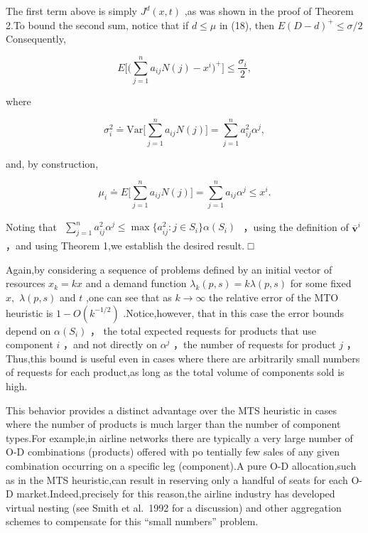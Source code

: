 The first term above is simply \(J ^ { d } ( x , t )\) ,as was shown in
the proof of Theorem 2.To bound the second sum, notice that if
\(d \leqslant \mu\) in (18), then
\(E ( D - d ) ^ { + } \leqslant \sigma / 2\) Consequently,

\[
E \Bigg [ \Bigg ( \sum _ { j = 1 } ^ { n } a _ { i j } N ( j ) - x ^ { i } \Bigg ) ^ { + } \Bigg ] \leqslant \frac { \sigma _ { i } } { 2 } ,
\]

where

\[
\sigma _ { i } ^ { 2 } \doteq \mathrm { V a r } \biggl [ \sum _ { j = 1 } ^ { n } a _ { i j } N ( j ) \biggr ] = \sum _ { j = 1 } ^ { n } a _ { i j } ^ { 2 } \alpha ^ { j } ,
\]

and, by construction,

\[
\mu _ { i } \doteq E { \biggl [ } \sum _ { j = 1 } ^ { n } a _ { i j } N ( j ) { \biggr ] } = \sum _ { j = 1 } ^ { n } a _ { i j } \alpha ^ { j } \leqslant x ^ { i } .
\]

Noting that
\(\begin{array} { r } { \sum _ { j = 1 } ^ { n } a _ { i j } ^ { 2 } \alpha ^ { j } \leqslant \operatorname* { m a x } \{ a _ { i j } ^ { 2 } \colon j \in S _ { i } \} \alpha ( S _ { i } ) } \end{array}\)
，using the definition of
\(\overline { { \boldsymbol { v } } } ^ { i }\) ，and using Theorem 1,we
establish the desired result. □

Again,by considering a sequence of problems defined by an initial vector
of resources \(x _ { k } = k x\) and a demand function
\(\lambda _ { k } ( p , s ) = k \lambda ( p , s )\) for some fixed
\(x ,\) \(\lambda ( p , s )\) and \(t\) ,one can see that as
\(k \to \infty\) the relative error of the MTO heuristic is
\(1 - O ( k ^ { - 1 / 2 } )\) .Notice,however, that in this case the
error bounds depend on \(\alpha ( S _ { i } )\) ， the total expected
requests for products that use component \(i\) ，and not directly on
\(\alpha ^ { j }\) ，the number of requests for product \(j\)
，Thus,this bound is useful even in cases where there are arbitrarily
small numbers of requests for each product,as long as the total volume
of components sold is high.

This behavior provides a distinct advantage over the MTS heuristic in
cases where the number of products is much larger than the number of
component types.For example,in airline networks there are typically a
very large number of O-D combinations (products) offered with po
tentially few sales of any given combination occurring on a specific leg
(component).A pure O-D allocation,such as in the MTS heuristic,can
result in reserving only a handful of seats for each O-D
market.Indeed,precisely for this reason,the airline industry has
developed virtual nesting (see Smith et al.~1992 for a discussion) and
other aggregation schemes to compensate for this ``small numbers''
problem.


